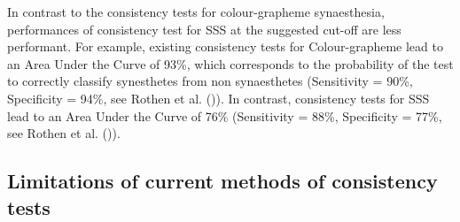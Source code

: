 \documentclass[
  man,
  floatsintext,
  longtable,
  a4paper,
  nolmodern,
  notxfonts,
  notimes,
  colorlinks=true,linkcolor=blue,citecolor=blue,urlcolor=blue]{apa7}
\begin{document}
 In
contrast to the consistency tests for colour-grapheme synaesthesia,
performances of consistency test for SSS at the suggested cut-off are
less performant. For example, existing consistency tests for
Colour-grapheme lead to an Area Under the Curve of 93\%, which
corresponds to the probability of the test to correctly classify
synesthetes from non synaesthetes (Sensitivity = 90\%, Specificity =
94\%, see Rothen et al. ()). In
contrast, consistency tests for SSS lead to an Area Under the Curve of
76\% (Sensitivity = 88\%, Specificity = 77\%, see Rothen et al.
()).

\subsection{Limitations of current methods of consistency
tests}\label{limitations-of-current-methods-of-consistency-tests}

\end{document}
